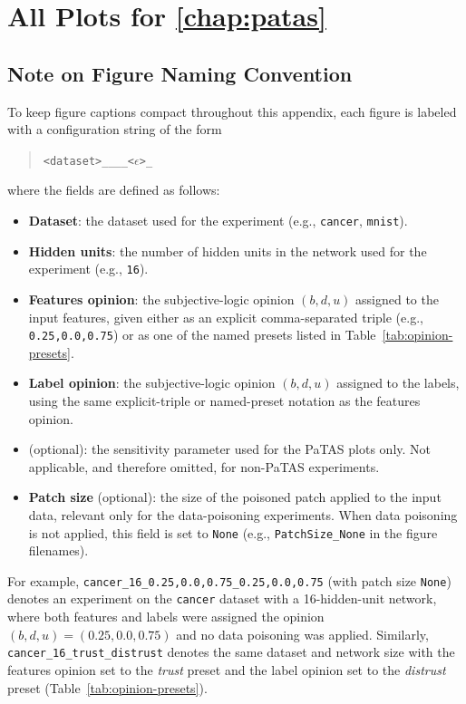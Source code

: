\chapter{All Plots for \cref{chap:patas}}

\section*{Note on Figure Naming Convention}
\label{sec:appendixB-naming}

To keep figure captions compact throughout this appendix, each figure is
labeled with a configuration string of the form

\begin{quote}
\texttt{<dataset>\_<hidden units>\_<features op>\_<label op>\_<\(\epsilon\)>\_<patch size>}
\end{quote}

where the fields are defined as follows:

\begin{itemize}
    \item \textbf{Dataset}: the dataset used for the experiment (e.g., \texttt{cancer}, \texttt{mnist}).
    \item \textbf{Hidden units}: the number of hidden units in the network used for the experiment (e.g., \texttt{16}).
    \item \textbf{Features opinion}: the subjective-logic opinion $(b,d,u)$ assigned to the input features, given either as an explicit comma-separated triple (e.g., \texttt{0.25,0.0,0.75}) or as one of the named presets listed in Table~\ref{tab:opinion-presets}.
    \item \textbf{Label opinion}: the subjective-logic opinion $(b,d,u)$ assigned to the labels, using the same explicit-triple or named-preset notation as the features opinion.
    \item \boldmath{$\epsilon$} (optional): the sensitivity parameter used for the PaTAS plots only. Not applicable, and therefore omitted, for non-PaTAS experiments.
    \item \textbf{Patch size} (optional): the size of the poisoned patch applied to the input data, relevant only for the data-poisoning experiments. When data poisoning is not applied, this field is set to \texttt{None} (e.g., \texttt{PatchSize\_None} in the figure filenames).
\end{itemize}

For example, \texttt{cancer\_16\_0.25,0.0,0.75\_0.25,0.0,0.75} (with patch
size \texttt{None}) denotes an experiment on the \texttt{cancer} dataset
with a 16-hidden-unit network, where both features and labels were
assigned the opinion $(b,d,u) = (0.25, 0.0, 0.75)$ and no data poisoning
was applied. Similarly, \texttt{cancer\_16\_trust\_distrust} denotes the
same dataset and network size with the features opinion set to the
\emph{trust} preset and the label opinion set to the \emph{distrust}
preset (Table~\ref{tab:opinion-presets}).


